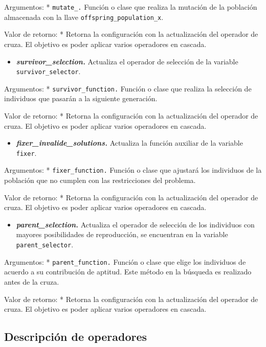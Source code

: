 \documentclass[11pt]{article}
\providecommand{\tightlist}{%
      \setlength{\itemsep}{0pt}\setlength{\parskip}{0pt}}
\begin{document}
Argumentos: * \texttt{mutate\_.} Función o clase que realiza la mutación
de la población almacenada con la llave
\texttt{offspring\_population\_x}.

Valor de retorno: * Retorna la configuración con la actualización del
operador de cruza. El objetivo es poder aplicar varios operadores en
cascada.

\begin{itemize}
\tightlist
\item
  \emph{\textbf{survivor\_selection.}} Actualiza el operador de
  selección de la variable \texttt{survivor\_selector}.
\end{itemize}

Argumentos: * \texttt{survivor\_function.} Función o clase que realiza
la selección de individuos que pasarán a la siguiente generación.

Valor de retorno: * Retorna la configuración con la actualización del
operador de cruza. El objetivo es poder aplicar varios operadores en
cascada.

\begin{itemize}
\tightlist
\item
  \emph{\textbf{fixer\_invalide\_solutions.}} Actualiza la función
  auxiliar de la variable \texttt{fixer}.
\end{itemize}

Argumentos: * \texttt{fixer\_function.} Función o clase que ajustará los
individuos de la población que no cumplen con las restricciones del
problema.

Valor de retorno: * Retorna la configuración con la actualización del
operador de cruza. El objetivo es poder aplicar varios operadores en
cascada.

\begin{itemize}
\tightlist
\item
  \emph{\textbf{parent\_selection.}} Actualiza el operador de selección
  de los individuos con mayores posibilidades de reproducción, se
  encuentran en la variable \texttt{parent\_selector}.
\end{itemize}

Argumentos: * \texttt{parent\_function.} Función o clase que elige los
individuos de acuerdo a su contribución de aptitud. Este método en la
búsqueda es realizado antes de la cruza.

Valor de retorno: * Retorna la configuración con la actualización del
operador de cruza. El objetivo es poder aplicar varios operadores en
cascada.

    \subsection{Descripción de
operadores}\label{descripciuxf3n-de-operadores}
\end{document}
